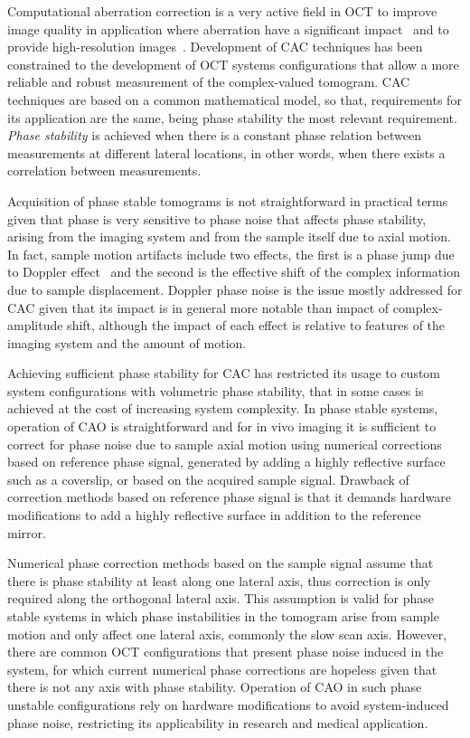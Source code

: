Computational aberration correction is a very active field in OCT to improve image quality in application where aberration have a significant impact~\cite{} and to provide high-resolution images~\cite{}. Development of CAC techniques has been constrained to the development of OCT systems configurations that allow a more reliable and robust measurement of the complex-valued tomogram. CAC techniques are based on a common mathematical model, so that, requirements for its application are the same, being phase stability the most relevant requirement. \textit{Phase stability} is achieved when there is a constant phase relation between measurements at different lateral locations, in other words, when there exists a correlation between measurements.

Acquisition of phase stable tomograms is not straightforward in practical terms given that phase is very sensitive to phase noise that affects phase stability, arising from the imaging system and from the sample itself due to axial motion. In fact, sample motion artifacts include two effects, the first is a phase jump due to Doppler effect~\cite{} and the second is the effective shift of the complex information due to sample displacement. Doppler phase noise is the issue mostly addressed for CAC given that its impact is in general more notable than impact of complex-amplitude shift, although the impact of each effect is relative to features of the imaging system and the amount of motion.

Achieving sufficient phase stability for CAC has restricted its usage to custom system configurations with volumetric phase stability, that in some cases is achieved at the cost of increasing system complexity. In phase stable systems, operation of CAO is straightforward and for in vivo imaging it is sufficient to correct for phase noise due to sample axial motion using numerical corrections based on reference phase signal, generated by adding a highly reflective surface such as a coverslip, or based on the acquired sample signal. Drawback of correction methods based on reference phase signal is that it demands hardware modifications to add a highly reflective surface in addition to the reference mirror.

Numerical phase correction methods based on the sample signal assume that there is phase stability at least along one lateral axis, thus correction is only required along the orthogonal lateral axis. This assumption is valid for phase stable systems in which phase instabilities in the tomogram arise from sample motion and only affect one lateral axis, commonly the slow scan axis. However, there are common OCT configurations that present phase noise induced in the system, for which current numerical phase corrections are hopeless given that there is not any axis with phase stability. Operation of CAO in such phase unstable configurations rely on hardware modifications to avoid system-induced phase noise, restricting its applicability in research and medical application.


